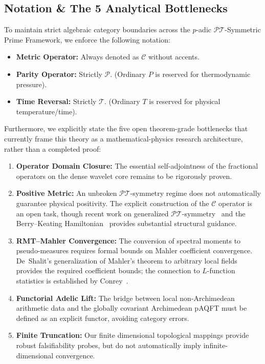 \subsection*{Notation \& The 5 Analytical Bottlenecks}
To maintain strict algebraic category boundaries across the $p$-adic $\mathcal{PT}$-Symmetric Prime Framework, we enforce the following notation:
\begin{itemize}
    \item \textbf{Metric Operator:} Always denoted as $\mathcal{C}$ without accents.
    \item \textbf{Parity Operator:} Strictly $\mathcal{P}$. (Ordinary $P$ is reserved for thermodynamic pressure).
    \item \textbf{Time Reversal:} Strictly $\mathcal{T}$. (Ordinary $T$ is reserved for physical temperature/time).
\end{itemize}

Furthermore, we explicitly state the five open theorem-grade bottlenecks that currently frame this theory as a mathematical-physics research architecture, rather than a completed proof:
\begin{enumerate}
    \item \textbf{Operator Domain Closure:} The essential self-adjointness of the fractional operators on the dense wavelet core remains to be rigorously proven.
    \item \textbf{Positive Metric:} An unbroken $\mathcal{PT}$-symmetry regime does not automatically guarantee physical positivity. The explicit construction of the $\mathcal{C}$ operator is an open task, though recent work on generalized $\mathcal{PT}$-symmetry~\cite{BenderBerryMandilara2002} and the Berry--Keating Hamiltonian~\cite{BenderBrodyMuller2017} provides substantial structural guidance.
    \item \textbf{RMT--Mahler Convergence:} The conversion of spectral moments to pseudo-measures requires formal bounds on Mahler coefficient convergence. De~Shalit's generalization of Mahler's theorem to arbitrary local fields~\cite{deShalit2016} provides the required coefficient bounds; the connection to $L$-function statistics is established by Conrey~\cite{Conrey_RMT}.
    \item \textbf{Functorial Adelic Lift:} The bridge between local non-Archimedean arithmetic data and the globally covariant Archimedean pAQFT must be defined as an explicit functor, avoiding category errors.
    \item \textbf{Finite Truncation:} Our finite dimensional topological mappings provide robust falsifiability probes, but do not automatically imply infinite-dimensional convergence.
\end{enumerate}

